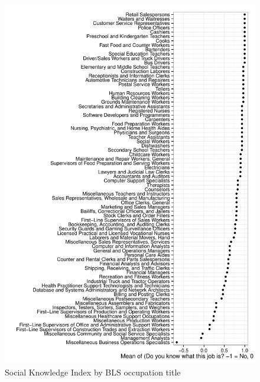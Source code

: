 \documentclass[11pt]{article}
\begin{document}
\begin{figure}
\caption{Social Knowledge Index by BLS occupation title} \label{fig:social_by_occupation}  
\centering
\begin{minipage}{0.95 \linewidth}
\includegraphics[width = \linewidth]{./plots/social_by_occupation.pdf}
\end{minipage}  
\end{figure} 


\end{document}
